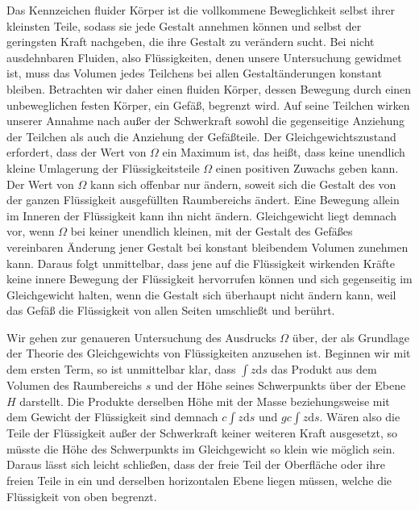 Das Kennzeichen fluider Körper ist die vollkommene Beweglichkeit selbst ihrer kleinsten Teile, sodass sie jede Gestalt annehmen können und selbst der geringsten Kraft nachgeben, die ihre Gestalt zu verändern sucht. Bei nicht ausdehnbaren Fluiden, also Flüssigkeiten, denen unsere Untersuchung gewidmet ist, muss das Volumen jedes Teilchens bei allen Gestaltänderungen konstant bleiben. Betrachten wir daher einen fluiden Körper, dessen Bewegung durch einen unbeweglichen festen Körper, ein Gefäß, begrenzt wird. Auf seine Teilchen wirken unserer Annahme nach außer der Schwerkraft sowohl die gegenseitige Anziehung der Teilchen als auch die Anziehung der Gefäßteile. Der Gleichgewichtszustand erfordert, dass der Wert von $\Omega$ ein Maximum ist, das heißt, dass keine unendlich kleine Umlagerung der Flüssigkeitsteile $\Omega$ einen positiven Zuwachs geben kann. Der Wert von $\Omega$ kann sich offenbar nur ändern, soweit sich die Gestalt des von der ganzen Flüssigkeit ausgefüllten Raumbereichs ändert. Eine Bewegung allein im Inneren der Flüssigkeit kann ihn nicht ändern. Gleichgewicht liegt demnach vor, wenn $\Omega$ bei keiner unendlich kleinen, mit der Gestalt des Gefäßes vereinbaren Änderung jener Gestalt bei konstant bleibendem Volumen zunehmen kann. Daraus folgt unmittelbar, dass jene auf die Flüssigkeit wirkenden Kräfte keine innere Bewegung der Flüssigkeit hervorrufen können und sich gegenseitig im Gleichgewicht halten, wenn die Gestalt sich überhaupt nicht ändern kann, weil das Gefäß die Flüssigkeit von allen Seiten umschließt und berührt.

Wir gehen zur genaueren Untersuchung des Ausdrucks $\Omega$ über, der als Grundlage der Theorie des Gleichgewichts von Flüssigkeiten anzusehen ist. Beginnen wir mit dem ersten Term, so ist unmittelbar klar, dass $\int z\mathrm{d}s$ das Produkt aus dem Volumen des Raumbereichs $s$ und der Höhe seines Schwerpunkts über der Ebene $H$ darstellt. Die Produkte derselben Höhe mit der Masse beziehungsweise mit dem Gewicht der Flüssigkeit sind demnach $c\int z\mathrm{d}s$ und $gc\int z\mathrm{d}s$. Wären also die Teile der Flüssigkeit außer der Schwerkraft keiner weiteren Kraft ausgesetzt, so müsste die Höhe des Schwerpunkts im Gleichgewicht so klein wie möglich sein. Daraus lässt sich leicht schließen, dass der freie Teil der Oberfläche oder ihre freien Teile in ein und derselben horizontalen Ebene liegen müssen, welche die Flüssigkeit von oben begrenzt.

